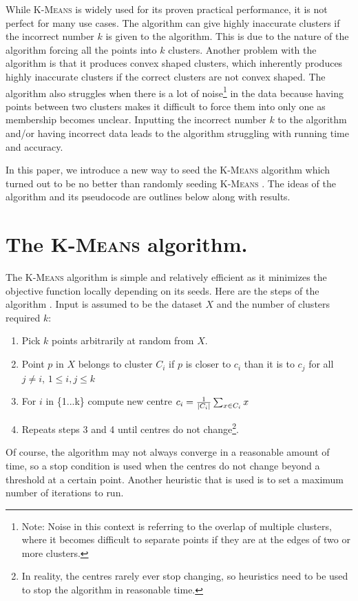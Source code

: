 \documentclass[12pt]{dalthesis}
\newcommand*{\kmeans}{\textsc{K-Means} } %
\DeclarePairedDelimiter\abs{\lvert}{\rvert}
\begin{document}
While \kmeans is widely used for its proven practical performance, it is not perfect for many use cases. The algorithm can give highly inaccurate clusters if the incorrect number $k$ is given to the algorithm. This is due to the nature of the algorithm forcing all the points into $k$ clusters. Another problem with the algorithm is that it produces convex shaped clusters, which inherently produces highly inaccurate clusters if the correct clusters are not convex shaped. The algorithm also struggles when there is a lot of noise\footnote{Note: Noise in this context is referring to the overlap of multiple clusters, where it becomes difficult to separate points if they are at the edges of two or more clusters.} in the data because having points between two clusters makes it difficult to force them into only one as membership becomes unclear. Inputting the incorrect number $k$ to the algorithm and/or having incorrect data leads to the algorithm struggling with running time and accuracy.

In this paper, we introduce a new way to seed the \kmeans algorithm which turned out to be no better than randomly seeding \kmeans. The ideas of the algorithm and its pseudocode are outlines below along with results.


\section{The \kmeans algorithm.}
The \kmeans algorithm is simple and relatively efficient as it minimizes the objective function locally depending on its seeds.
Here are the steps of the algorithm \cite{arthur2007k}. Input is assumed to be the dataset $X$ and the number of clusters required $k$:

\begin{enumerate}
  \item Pick $k$ points arbitrarily at random from $X$.
  \item Point $p$ in $X$ belongs to cluster $C_i$ if $p$ is closer to $c_i$ than it is to $c_j$ for all $j \neq i$, $1 \leq i,j \leq k$
  \item For $i$ in \{1...k\} compute new centre $c_i = \frac{1}{\abs{C_i}}\sum_{x \in C_i}x$
  \item Repeats steps 3 and 4 until centres do not change\footnote{In reality, the centres rarely ever stop changing, so heuristics need to be used to stop the algorithm in reasonable time.}.
\end{enumerate}

Of course, the algorithm may not always converge in a reasonable amount of time, so a stop condition is used when the centres do not change beyond a threshold at a certain point. Another heuristic that is used is to set a maximum number of iterations to run.
\end{document}
